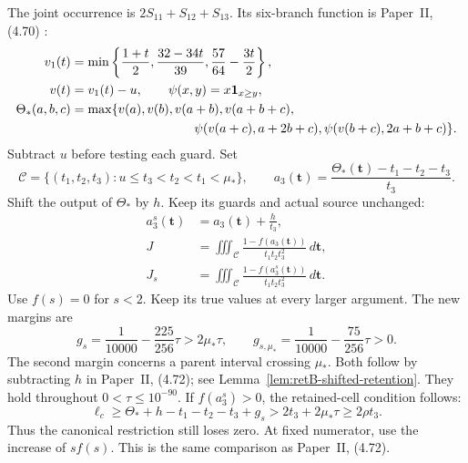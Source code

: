 The joint occurrence is $2S_{11}+S_{12}+S_{13}$.
Its six-branch function is Paper~II, (4.70)
\cite[(4.70)--(4.72)]{PaperII}:
\begin{equation}\label{eq:retB-theta}
\begin{aligned}
 v_1(t)&=\min\left\{\frac{1+t}{2},\frac{32-34t}{39},
                              \frac{57}{64}-\frac{3t}{2}\right\},\\
 v(t)&=v_1(t)-u,\qquad \psi(x,y)=x\mathbf1_{x\ge y},\\
 \Theta_*(a,b,c)&=\max\{v(a),v(b),v(a+b),v(a+b+c),\\
 &\hspace{34mm}\psi(v(a+c),a+2b+c),
                  \psi(v(b+c),2a+b+c)\}.
\end{aligned}
\end{equation}
Subtract $u$ before testing each guard.
Set
\begin{equation}\label{eq:retB-G-cone}
 \mathcal C=\{(t_1,t_2,t_3):u\le t_3<t_2<t_1<\mu_*\},
 \qquad
 a_3(\mathbf t)=\frac{\Theta_*(\mathbf t)-t_1-t_2-t_3}{t_3}.
\end{equation}
Shift the output of $\Theta_*$ by $h$.
Keep its guards and actual source unchanged:
\begin{equation}\label{eq:retB-G-shift}
\begin{aligned}
 a_3^s(\mathbf t)&=a_3(\mathbf t)+\frac h{t_3},\\
 J&=\iiint_{\mathcal C}\frac{1-f(a_3(\mathbf t))}
                      {t_1t_2t_3^2}\,d\mathbf t,\\
 J_s&=\iiint_{\mathcal C}\frac{1-f(a_3^s(\mathbf t))}
                      {t_1t_2t_3^2}\,d\mathbf t.
\end{aligned}
\end{equation}
Use $f(s)=0$ for $s<2$.
Keep its true values at every larger argument.
The new margins are
\begin{equation}\label{eq:retB-G-margins}
 g_s=\frac1{10000}-\frac{225}{256}\tau>2\mu_*\tau,
 \qquad
 g_{s,\mu_*}=\frac1{10000}-\frac{75}{256}\tau>0.
\end{equation}
The second margin concerns a parent interval crossing $\mu_*$.
Both follow by subtracting $h$ in Paper~II, (4.72); see
Lemma~\ref{lem:retB-shifted-retention}.
They hold throughout $0<\tau\le10^{-90}$.
If $f(a_3^s)>0$, the retained-cell condition follows:
\begin{equation}\label{eq:retB-G-retention}
 \ell_c\ge\Theta_*+h-t_1-t_2-t_3+g_s
       >2t_3+2\mu_*\tau\ge2\rho t_3.
\end{equation}
Thus the canonical restriction still loses zero.
At fixed numerator, use the increase of $sf(s)$.
This is the same comparison as Paper~II, (4.72).

